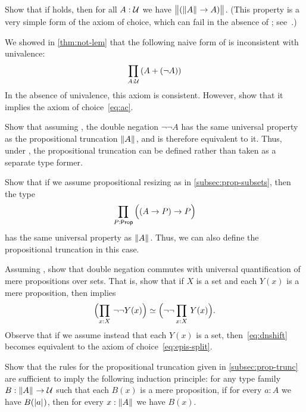 \begin{ex}
  Show that if \LEM{} holds, then for all $A:\mathcal{U}$ we have $\bigl\Vert (\mathopen{}\left\Vert A\right\Vert_{}\mathclose{} \to A)\bigr\Vert_{}$.
  (This property is a very simple form of the axiom of choice, which can fail in the absence of \LEM{}; see~\cite{krausgeneralizations}.)
\end{ex}

\begin{ex}
  We showed in \autoref{thm:not-lem} that the following naive form of \LEM{} is inconsistent with univalence:
  \[ \prd{A:\type} (A+(\neg A)) \]
  In the absence of univalence, this axiom is consistent.
  However, show that it implies the axiom of choice~\eqref{eq:ac}.
\end{ex}

\begin{ex}\label{ex:lem-brck}
  Show that assuming \LEM{}, the double negation $\neg \neg A$ has the same universal property as the propositional truncation $\mathopen{}\left\Vert A\right\Vert_{}\mathclose{}$, and is therefore equivalent to it.
  Thus, under \LEM{}, the propositional truncation can be defined rather than taken as a separate type former.
\end{ex}

\begin{ex}\label{ex:impred-brck}
  Show that if we assume propositional resizing as in \autoref{subsec:prop-subsets}, then the type
  \[\prd{P:\prop} \Parens{(A\to P)\to P}\]
  has the same universal property as $\mathopen{}\left\Vert A\right\Vert_{}\mathclose{}$.
  Thus, we can also define the propositional truncation in this case.
\end{ex}

\begin{ex}
  Assuming \LEM{}, show that double negation commutes with universal quantification of mere propositions over sets.
  That is, show that if $X$ is a set and each $Y(x)$ is a mere proposition, then \LEM{} implies
  \begin{equation}
    \eqv{\Parens{\prd{x:X} \neg\neg Y(x)}}{\Parens{\neg\neg \prd{x:X} Y(x)}}.\label{eq:dnshift}
  \end{equation}
  Observe that if we assume instead that each $Y(x)$ is a set, then~\eqref{eq:dnshift} becomes equivalent to the axiom of choice~\eqref{eq:epis-split}.
\end{ex}

\begin{ex}\label{ex:prop-trunc-ind}
  Show that the rules for the propositional truncation given in \autoref{subsec:prop-trunc} are sufficient to imply the following induction principle: for any type family $B:\mathopen{}\left\Vert A\right\Vert_{}\mathclose{} \to \mathcal{U}$ such that each $B(x)$ is a mere proposition, if for every $a:A$ we have $B(\mathopen{}\left|a\right|_{}^{}\mathclose{})$, then for every $x:\mathopen{}\left\Vert A\right\Vert_{}\mathclose{}$ we have $B(x)$.
\end{ex}

